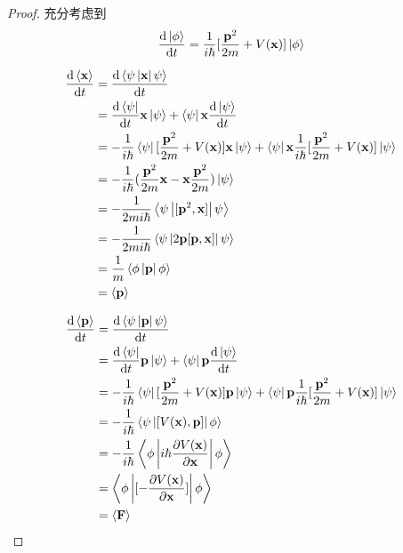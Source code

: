\documentclass[12pt,a4paper,openany,twoside]{book}
\numberwithin{equation}{section}
\newcommand{\bracketl}[3]{\left\langle #1 \left| #2 \right| #3 \right\rangle}
\newcommand{\mean}[1]{\left\langle #1 \right\rangle}
\newcommand{\ud}{\mathrm{d}}
\begin{document}
        \begin{proof}
          充分考虑到
          \begin{equation}
            \frac{\ud\ket{\phi}}{\ud t}=\frac{1}{i\hbar}[\frac{\textbf{p}^2}{2m}+V(\textbf{x})]\ket{\phi}
          \end{equation}

          \begin{align*}
            \frac{\ud\mean{\textbf{x}}}{\ud t}  & = \frac{\ud\bracketl{\psi}{\textbf{x}}{\psi}}{\ud t} \\ 
            & = \frac{\ud\bra{\psi}}{\ud t} \textbf{x} \ket{\psi} + \bra{\psi} \textbf{x} \frac{\ud\ket{\psi}}{\ud t} \\
            &= - \frac{1}{i \hbar}\bra{\psi}[\frac{\textbf{p}^2}{2m}+V(\textbf{x})]\textbf{x}\ket{\psi}+ \bra{\psi}\textbf{x}\frac{1} {i\hbar}[\frac{\textbf{p}^2}{2m}+V(\textbf{x})]\ket{\psi}\\
            &= -\frac{1}{i\hbar}(\frac{\textbf{p}^2}{2m}\textbf{x}-\textbf{x}\frac{\textbf{p}^2}{2m})\ket{\psi}\\
            &= -\frac{1}{2mi\hbar}\bracketl{\psi}{[\textbf{p}^2,\textbf{x}]}{\psi}\\
            &=-\frac{1}{2mi\hbar}\bracketl{\psi}{2\textbf{p}[\textbf{p},\textbf{x}]}{\psi}\\
            &=\frac{1}{m}\bracketl{\phi}{\textbf{p}}{\phi}\\
            &=\mean{\textbf{p}}
          \end{align*}

          \begin{align*}
            \frac{\ud\mean{\textbf{p}}}{\ud t} &= \frac{\ud\bracketl{\psi}{\textbf{p}}{\psi}}{\ud t}\\
            &=\frac{\ud\bra{\psi}}{\ud t} \textbf{p} \ket{\psi} + \bra{\psi} \textbf{p} \frac{\ud\ket{\psi}}{\ud t} \\
            &= - \frac{1}{i \hbar}\bra{\psi}[\frac{\textbf{p}^2}{2m}+V(\textbf{x})]\textbf{p}\ket{\psi}+ \bra{\psi}\textbf{p}\frac{1} {i\hbar}[\frac{\textbf{p}^2}{2m}+V(\textbf{x})]\ket{\psi}\\
            &= -\frac{1}{i\hbar}\bracketl{\psi}{[V(\textbf{x}),\textbf{p}]}{\phi} \\
            & = -\frac{1}{i\hbar}\bracketl{\phi}{i\hbar\frac{\partial V(\textbf{x})}{\partial \textbf{x}}}{\phi}\\
            & = \bracketl{\phi}{[-\frac{\partial V(\textbf{x})}{\partial \textbf{x}}]}{\phi}\\
            & = \mean{\textbf{F}}
          \end{align*}


\end{proof}
\end{document}
